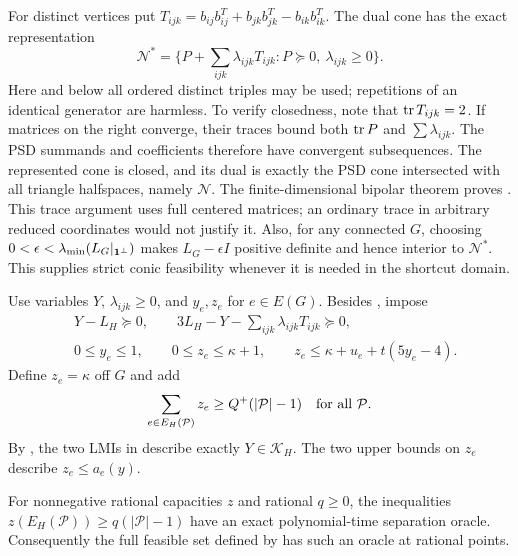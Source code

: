 For distinct vertices put
$T_{ijk}=b_{ij}b_{ij}^T+b_{jk}b_{jk}^T-b_{ik}b_{ik}^T$.
The dual cone has the exact representation
\begin{equation}
 \mathcal N^*=\{P+\sum_{ijk}\lambda_{ijk}T_{ijk}:
                         P\succeq0,\ \lambda_{ijk}\ge0\}.
 \label{eq:ta-dual-cone}
\end{equation}
Here and below all ordered distinct triples may be used; repetitions
of an identical generator are harmless. To verify closedness, note that
$\operatorname{tr} T_{ijk}=2$. If matrices on the right converge, their traces bound
both $\operatorname{tr} P$ and $\sum\lambda_{ijk}$. The PSD summands and coefficients
therefore have convergent subsequences. The represented cone is closed,
and its dual is exactly the PSD cone intersected with all triangle
halfspaces, namely $\mathcal N$. The finite-dimensional bipolar theorem
proves . This trace argument uses full centered
matrices; an ordinary trace in arbitrary reduced coordinates would not
justify it. Also, for any connected $G$, choosing
$0<\epsilon<\lambda_{\min}(L_G|_{\mathbf 1^\perp})$ makes
$L_G-\epsilon I$ positive definite and hence interior to
$\mathcal N^*$. This supplies strict conic feasibility whenever it is
needed in the shortcut domain.

Use variables $Y$, $\lambda_{ijk}\ge0$, and $y_e,z_e$ for $e\in E(G)$.
Besides , impose
\begin{align}
 &Y-L_H\succeq0,\qquad
  3L_H-Y-\sum_{ijk}\lambda_{ijk}T_{ijk}\succeq0,
       \label{eq:ta-conic-representation}\\
 &0\le y_e\le1,\qquad 0\le z_e\le\kappa+1,\qquad
 z_e\le\kappa+u_e+t(5y_e-4).
       \label{eq:ta-z-constraints}
\end{align}
Define $z_e=\kappa$ off $G$ and add
\begin{equation}
 \sum_{e\in E_H(\mathcal P)}z_e
               \ge Q^+(|\mathcal P|-1)\quad\hbox{for all }\mathcal P.
 \label{eq:ta-computational-packing}
\end{equation}
By , the two LMIs in
 describe exactly $Y\in\mathcal K_H$.
The two upper bounds on $z_e$ describe $z_e\le a_e(y)$.

\begin{lemma}
\label{lem:ta-separation}
For nonnegative rational capacities $z$ and rational $q\ge0$, the
inequalities $z(E_H(\mathcal P))\ge q(|\mathcal P|-1)$ have an exact
polynomial-time separation oracle. Consequently the full feasible set defined by
has such an oracle at rational points.
\end{lemma}


